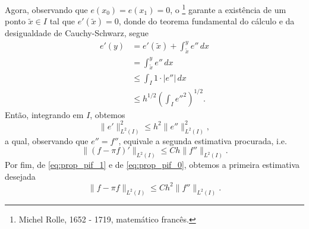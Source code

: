 \begin{dem}
Agora, observando que $e(x_0)=e(x_1)=0$, o \footnote{Michel Rolle, 1652 - 1719, matemático francês.} garante a existência de um ponto $\tilde{x}\in I$ tal que $e'(\tilde{x})=0$, donde do teorema fundamental do cálculo e da desigualdade de Cauchy-Schwarz, segue
\begin{align}
  e'(y) &= e'(\tilde{x}) + \int_{\tilde{x}}^y e''\,dx \\
        &= \int_{\tilde{x}}^y e''\,dx\\
        &\leq \int_{I}1\cdot |e''|\,dx\\
        &\leq h^{1/2}\left(\int_I e''^2\right)^{1/2}.
\end{align}
Então, integrando em $I$, obtemos
\begin{equation}\label{eq:prop_pif_1}
  \|e'\|_{L^2(I)}^2 \leq h^2\|e''\|_{L^2(I)}^2,
\end{equation}
a qual, observando que $e'' = f''$, equivale a segunda estimativa procurada, i.e.
\begin{equation}
  \|(f-\pi f)'\|_{L^2(I)} \leq C h \|f''\|_{L^2(I)}.
\end{equation}
Por fim, de \eqref{eq:prop_pif_1} e de \eqref{eq:prop_pif_0}, obtemos a primeira estimativa desejada
\begin{equation}
  \|f - \pi f\|_{L^2(I)} \leq C h^2 \|f''\|_{L^2(I)}.
\end{equation}
\end{dem}



% 


